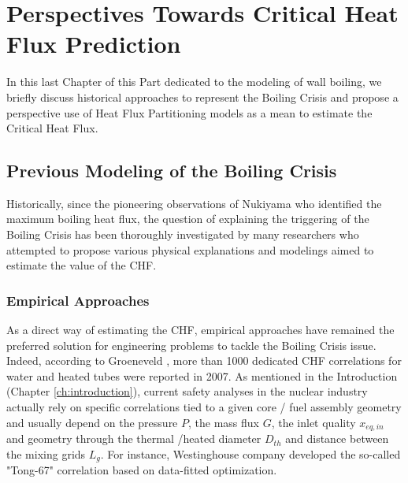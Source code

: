 
\chapter{Perspectives Towards Critical Heat Flux Prediction} %

\label{ch:to_CHF} %

\minitoc

In this last Chapter of this Part dedicated to the modeling of wall boiling, we briefly discuss historical approaches to represent the Boiling Crisis and propose a perspective use of Heat Flux Partitioning models as a mean to estimate the Critical Heat Flux.


\section{Previous Modeling of the Boiling Crisis}
\label{sec:old_chf}

Historically, since the pioneering observations of Nukiyama \cite{nukiyama_maximum_1966} who identified the maximum boiling heat flux, the question of explaining the triggering of the Boiling Crisis has been thoroughly investigated by many researchers who attempted to propose various physical explanations and modelings aimed to estimate the value of the CHF.


\subsection{Empirical Approaches}

As a direct way of estimating the CHF, empirical approaches have remained the preferred solution for engineering problems to tackle the Boiling Crisis issue. Indeed, according to Groeneveld \cite{groeneveld_2006_2007}, more than 1000 dedicated CHF correlations for water and heated tubes were reported in 2007. As mentioned in the Introduction (Chapter \ref{ch:introduction}), current safety analyses in the nuclear industry actually rely on specific correlations tied to a given core / fuel assembly geometry and usually depend on the pressure $P$, the mass flux $G$, the inlet quality $x_{eq,in}$ and geometry through the thermal /heated diameter $D_{th}$ and distance between the mixing grids $L_{g}$. For instance, Westinghouse company developed the so-called "Tong-67" correlation \cite{tong_prediction_1967} based on data-fitted optimization. 

